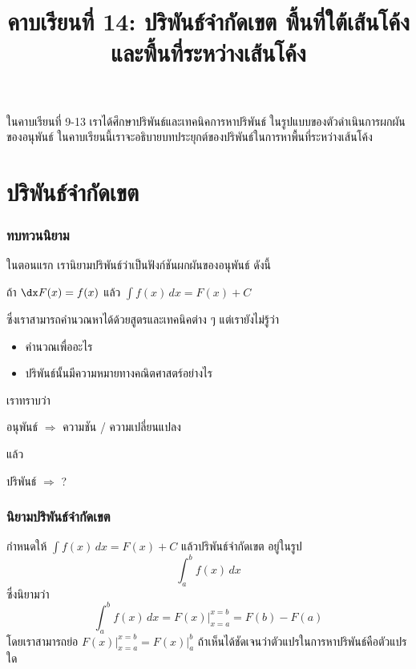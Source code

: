 \title{คาบเรียนที่ 14: ปริพันธ์จำกัดเขต พื้นที่ใต้เส้นโค้ง และพื้นที่ระหว่างเส้นโค้ง}
\frame{\titlepage}

\begin{frame}
ในคาบเรียนที่ 9-13 เราได้ศึกษาปริพันธ์และเทคนิคการหาปริพันธ์ ในรูปแบบของตัวดำเนินการผกผันของอนุพันธ์ ในคาบเรียนนี้เราจะอธิบายบทประยุกต์ของปริพันธ์ในการหาพื้นที่ระหว่างเส้นโค้ง
\tableofcontents
\end{frame}


\section{ปริพันธ์จำกัดเขต}
\frame{\sectionpage}

\begin{frame}
\frametitle{ทบทวนนิยาม}
ในตอนแรก เรานิยามปริพันธ์ว่าเป็นฟังก์ชันผกผันของอนุพันธ์ ดังนี้
\begin{block}{}
\begin{center}
ถ้า $\displaystyle \dx F(x) = f(x)$ แล้ว $\displaystyle \int f(x) \, dx = F(x) + C$
\end{center}
\end{block}

ซึ่งเราสามารถคำนวณหาได้ด้วยสูตรและเทคนิคต่าง ๆ แต่เรายังไม่รู้ว่า
\begin{itemize}
\item คำนวณเพื่ออะไร 
\item ปริพันธ์นั้นมีความหมายทางคณิตศาสตร์อย่างไร
\end{itemize}
\end{frame}

\begin{frame}
เราทราบว่า

\begin{center}
อนุพันธ์ $\Longrightarrow$ ความชัน / ความเปลี่ยนแปลง
\end{center}

แล้ว
\begin{center}
ปริพันธ์ $\Longrightarrow$ ?
\end{center}
\end{frame}

\begin{frame}
\frametitle{นิยามปริพันธ์จำกัดเขต}
\centering
\resizebox{!}{0.8\textheight}
{
\begin{defn}{}{}
กำหนดให้ $\int f(x) \, dx = F(x) + C$ แล้วปริพันธ์จำกัดเขต อยู่ในรูป 
\[ \int_a^b f(x) \, dx\] 
ซึ่งนิยามว่า
\begin{equation}
\int_a^b f(x) \, dx = F(x) \Big|_{x=a}^{x=b} = F(b) - F(a)
\end{equation}
โดยเราสามารถย่อ $F(x) \Big|_{x=a}^{x=b} = F(x) \Big|_a^b$ ถ้าเห็นได้ชัดเจนว่าตัวแปรในการหาปริพันธ์คือตัวแปรใด
\end{defn}
}
\end{frame}



